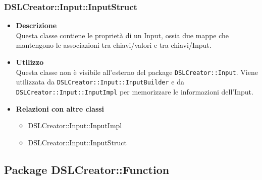  \subsubsection{DSLCreator::Input::InputStruct}
                    \begin{itemize}
                        \item \textbf{Descrizione} \hfill \\
                          Questa classe contiene le proprietà di un Input, ossia due mappe che mantengono le associazioni tra chiavi/valori e tra chiavi/Input.
                        \item \textbf{Utilizzo} \hfill \\
                          Questa classe non è visibile all'esterno del package \texttt{DSLCreator::Input}. Viene utilizzata da \texttt{DSLCreator::Input::InputBuilder} e da \texttt{DSLCreator::Input::InputImpl} per memorizzare le informazioni dell'Input.
                        \item \textbf{Relazioni con altre classi}
                            \begin{itemize}
                              \item DSLCreator::Input::InputImpl
                              \item DSLCreator::Input::InputStruct
                            \end{itemize}
                    \end{itemize}  

\subsection{Package DSLCreator::Function}
